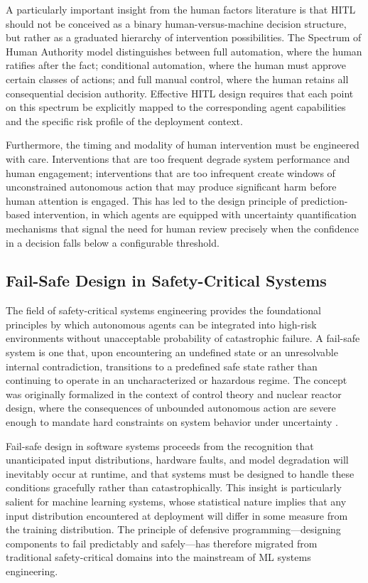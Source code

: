 A particularly important insight from the human factors literature is that HITL should not be conceived as a binary human-versus-machine decision structure, but rather as a graduated hierarchy of intervention possibilities. The Spectrum of Human Authority model distinguishes between full automation, where the human ratifies after the fact; conditional automation, where the human must approve certain classes of actions; and full manual control, where the human retains all consequential decision authority. Effective HITL design requires that each point on this spectrum be explicitly mapped to the corresponding agent capabilities and the specific risk profile of the deployment context.

Furthermore, the timing and modality of human intervention must be engineered with care. Interventions that are too frequent degrade system performance and human engagement; interventions that are too infrequent create windows of unconstrained autonomous action that may produce significant harm before human attention is engaged. This has led to the design principle of prediction-based intervention, in which agents are equipped with uncertainty quantification mechanisms that signal the need for human review precisely when the confidence in a decision falls below a configurable threshold.

\subsection{Fail-Safe Design in Safety-Critical Systems}

The field of safety-critical systems engineering provides the foundational principles by which autonomous agents can be integrated into high-risk environments without unacceptable probability of catastrophic failure. A fail-safe system is one that, upon encountering an undefined state or an unresolvable internal contradiction, transitions to a predefined safe state rather than continuing to operate in an uncharacterized or hazardous regime. The concept was originally formalized in the context of control theory and nuclear reactor design, where the consequences of unbounded autonomous action are severe enough to mandate hard constraints on system behavior under uncertainty \cite{wiener1948}.

Fail-safe design in software systems proceeds from the recognition that unanticipated input distributions, hardware faults, and model degradation will inevitably occur at runtime, and that systems must be designed to handle these conditions gracefully rather than catastrophically. This insight is particularly salient for machine learning systems, whose statistical nature implies that any input distribution encountered at deployment will differ in some measure from the training distribution. The principle of defensive programming—designing components to fail predictably and safely—has therefore migrated from traditional safety-critical domains into the mainstream of ML systems engineering.

